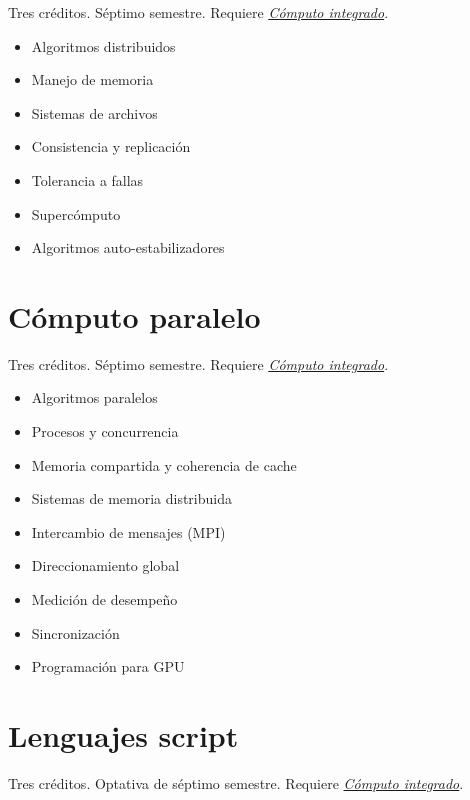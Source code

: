 \documentclass{article}
\begin{document}
\begin{multicols}{4}
Tres cr\'{e}ditos. S\'{e}ptimo semestre. Requiere \hyperlink{ci}{\em
  C\'{o}mputo integrado}.

\begin{itemize}
\item{Algoritmos distribuidos}
\item{Manejo de memoria}
\item{Sistemas de archivos}
\item{Consistencia y replicaci\'{o}n}
\item{Tolerancia a fallas}
\item{Superc\'{o}mputo}
\item{Algoritmos auto-estabilizadores}
\end{itemize}

\vfill\null \columnbreak

\hypertarget{cp}{\section*{C\'{o}mputo paralelo}} 

Tres cr\'{e}ditos. S\'{e}ptimo semestre. Requiere \hyperlink{ci}{\em
  C\'{o}mputo integrado}.

\begin{itemize}
\item{Algoritmos paralelos}
\item{Procesos y concurrencia}
\item{Memoria compartida y coherencia de cache}
\item{Sistemas de memoria distribuida}
\item{Intercambio de mensajes (MPI)}
\item{Direccionamiento global}
\item{Medici\'{o}n de desempe\~{n}o}
\item{Sincronizaci\'{o}n}
\item{Programaci\'{o}n para GPU}
\end{itemize}

\vfill\null \columnbreak

\hypertarget{ls}{\section*{Lenguajes script}}

Tres cr\'{e}ditos. Optativa de s\'{e}ptimo semestre.
 Requiere \hyperlink{ci}{\em
  C\'{o}mputo integrado}.


\end{multicols}
\end{document}
